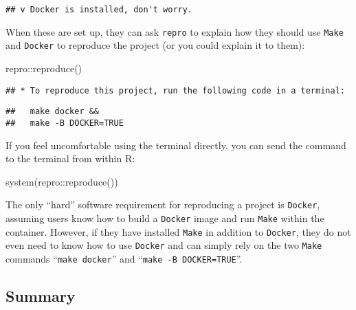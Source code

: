 \documentclass[psych,tutorial,accept,moreauthors,pdftex]{Definitions/mdpi}
\newenvironment{Shaded}{\begin{snugshade}}{\end{snugshade}}
\newcommand{\FunctionTok}[1]{\textcolor[rgb]{0.00,0.00,0.00}{#1}}
\newcommand{\NormalTok}[1]{#1}
\newcommand{\SpecialCharTok}[1]{\textcolor[rgb]{0.00,0.00,0.00}{#1}}
\begin{document}
\begin{paracol}{2}
\begin{adjustwidth}{0.5cm}{0cm}
\begin{verbatim}
## v Docker is installed, don't worry.
\end{verbatim}
\end{adjustwidth}


When these are set up, they can ask \texttt{repro} to explain how they
should use \texttt{Make} and \texttt{Docker} to reproduce the project
(or you could explain it to them):

\begin{adjustwidth}{0.5cm}{0cm} 
\begin{Shaded}
\begin{Highlighting}[]
\NormalTok{repro}\SpecialCharTok{::}\FunctionTok{reproduce}\NormalTok{()}
\end{Highlighting}
\end{Shaded}

\begin{verbatim}
## * To reproduce this project, run the following code in a terminal:
\end{verbatim}

\begin{verbatim}
##   make docker &&
##   make -B DOCKER=TRUE
\end{verbatim}
\end{adjustwidth}


If you feel uncomfortable using the terminal directly, you can send the
command to the terminal from within R:

\begin{adjustwidth}{0.5cm}{0cm} 
\begin{Shaded}
\begin{Highlighting}[]
\FunctionTok{system}\NormalTok{(repro}\SpecialCharTok{::}\FunctionTok{reproduce}\NormalTok{())}
\end{Highlighting}
\end{Shaded}
\end{adjustwidth}

The only ``hard'' software requirement for reproducing a project is
\texttt{Docker}, assuming users know how to build a \texttt{Docker}
image and run \texttt{Make} within the container. However, if they have
installed \texttt{Make} in addition to \texttt{Docker}, they do not even
need to know how to use \texttt{Docker} and can simply rely on the two
\texttt{Make} commands ``\texttt{make\ docker}'' and
``\texttt{make\ -B\ DOCKER=TRUE}''.

\subsection{Summary}\label{summary}


\end{paracol}
\end{document}
